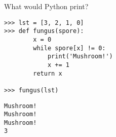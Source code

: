 \question What would Python print?
\begin{lstlisting}
>>> lst = [3, 2, 1, 0]
>>> def fungus(spore):
        x = 0
        while spore[x] != 0:
            print('Mushroom!')
            x += 1
        return x

>>> fungus(lst)
\end{lstlisting}

\begin{solution}[3cm]
\begin{lstlisting}
Mushroom!
Mushroom!
Mushroom!
3
\end{lstlisting}
\end{solution}
